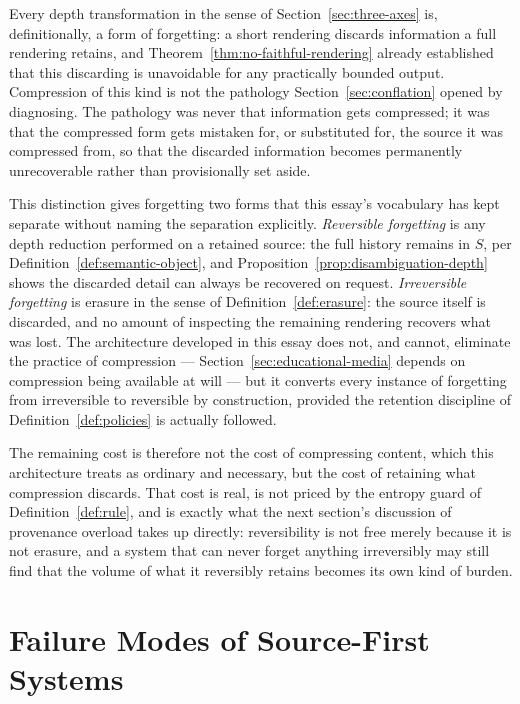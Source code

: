 \documentclass[11pt]{article}
\theoremstyle{definition}
\begin{document}
Every depth transformation in the sense of Section~\ref{sec:three-axes} is, definitionally, a form of forgetting: a short rendering discards information a full rendering retains, and Theorem~\ref{thm:no-faithful-rendering} already established that this discarding is unavoidable for any practically bounded output. Compression of this kind is not the pathology Section~\ref{sec:conflation} opened by diagnosing. The pathology was never that information gets compressed; it was that the compressed form gets mistaken for, or substituted for, the source it was compressed from, so that the discarded information becomes permanently unrecoverable rather than provisionally set aside.

This distinction gives forgetting two forms that this essay's vocabulary has kept separate without naming the separation explicitly. \emph{Reversible forgetting} is any depth reduction performed on a retained source: the full history remains in $S$, per Definition~\ref{def:semantic-object}, and Proposition~\ref{prop:disambiguation-depth} shows the discarded detail can always be recovered on request. \emph{Irreversible forgetting} is erasure in the sense of Definition~\ref{def:erasure}: the source itself is discarded, and no amount of inspecting the remaining rendering recovers what was lost. The architecture developed in this essay does not, and cannot, eliminate the practice of compression --- Section~\ref{sec:educational-media} depends on compression being available at will --- but it converts every instance of forgetting from irreversible to reversible by construction, provided the retention discipline of Definition~\ref{def:policies} is actually followed.

The remaining cost is therefore not the cost of compressing content, which this architecture treats as ordinary and necessary, but the cost of retaining what compression discards. That cost is real, is not priced by the entropy guard of Definition~\ref{def:rule}, and is exactly what the next section's discussion of provenance overload takes up directly: reversibility is not free merely because it is not erasure, and a system that can never forget anything irreversibly may still find that the volume of what it reversibly retains becomes its own kind of burden.

\section{Failure Modes of Source-First Systems}
\label{sec:failure-modes}
\end{document}
